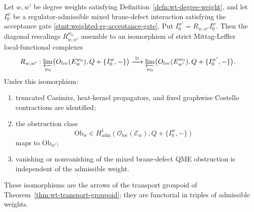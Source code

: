 \begin{thm}\label{thm:wt-regulator-independence-admissible}
  Let \(w,w'\) be degree weights satisfying
  Definition~\ref{defn:wt-degree-weight}, and let \(I_0^w\) be a
  regulator-admissible mixed brane-defect interaction satisfying the
  acceptance gate \ref{stmt:weighted-rg-acceptance-gate}.  Put
  \(I_0^{w'}=R_{w,w'}I_0^w\).  Then the diagonal rescalings
  \(R_{w,w'}^{w_0}\) assemble to an isomorphism of strict
  Mittag-Leffler local-functional complexes
  \[
    R_{w,w'}\colon
    \varprojlim_{w_0}
    \bigl(\mathcal O_{\mathrm{loc}}(\mathcal E_w^{w_0}),
      Q+\{I_0^w,-\}\bigr)
    \xrightarrow{\;\cong\;}
    \varprojlim_{w_0}
    \bigl(\mathcal O_{\mathrm{loc}}(\mathcal E_{w'}^{w_0}),
      Q+\{I_0^{w'},-\}\bigr).
  \]
  Under this isomorphism:
  \begin{enumerate}[label=(\roman*)]
    \item truncated Casimirs, heat-kernel propagators, and fixed
      graphwise Costello contractions are identified;
    \item the obstruction class
      \[
        \mathrm{Ob}_w\in
        H^1_{\mathrm{adm}}(\mathcal O_{\mathrm{loc}}(\mathcal E_w),
          Q+\{I_0^w,-\})
      \]
      maps to \(\mathrm{Ob}_{w'}\);
    \item vanishing or nonvanishing of the mixed brane-defect QME
      obstruction is independent of the admissible weight.
  \end{enumerate}
  These isomorphisms are the arrows of the transport groupoid of
  Theorem~\ref{thm:wt-transport-groupoid}; they are functorial in
  triples of admissible weights.
\end{thm}


